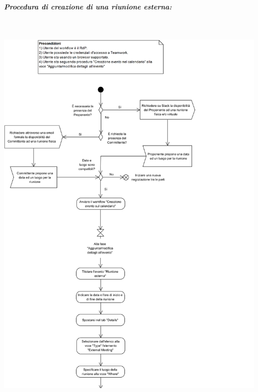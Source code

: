\begin{samepage}
	\subparagraph{Procedura di creazione di una riunione esterna:}\mbox{}\\
	
	\begin{center}
		\includegraphics[width=14cm]{../../documenti/NormeDiProgetto/DiagrammiProcedure/RiunioneEsterna1.png}
	\end{center}
\end{samepage}
